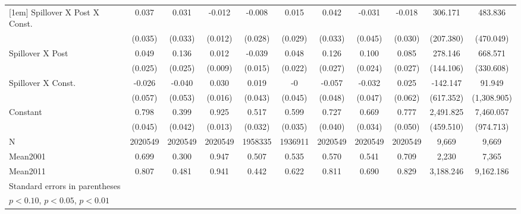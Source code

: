 {\begin{tabular}{l*{10}{c}}
[1em]
Spillover X Post X Const.&    0.037         &    0.031         &   -0.012         &   -0.008         &    0.015         &    0.042         &   -0.031         &   -0.018         &  306.171         &  483.836         \\
                &  (0.035)         &  (0.033)         &  (0.012)         &  (0.028)         &  (0.029)         &  (0.033)         &  (0.045)         &  (0.030)         &(207.380)         &(470.049)         \\
[1em]
Spillover X Post&    0.049\sym{*}  &    0.136\sym{***}&    0.012         &   -0.039\sym{**} &    0.048\sym{**} &    0.126\sym{***}&    0.100\sym{***}&    0.085\sym{***}&  278.146\sym{*}  &  668.571\sym{**} \\
                &  (0.025)         &  (0.025)         &  (0.009)         &  (0.015)         &  (0.022)         &  (0.027)         &  (0.024)         &  (0.027)         &(144.106)         &(330.608)         \\
[1em]
Spillover X Const.&   -0.026         &   -0.040         &    0.030\sym{*}  &    0.019         &   -0         &   -0.057         &   -0.032         &    0.025         & -142.147         &   91.949         \\
                &  (0.057)         &  (0.053)         &  (0.016)         &  (0.043)         &  (0.045)         &  (0.048)         &  (0.047)         &  (0.062)         &(617.352)         &(1,308.905)         \\
[1em]
Constant        &    0.798\sym{***}&    0.399\sym{***}&    0.925\sym{***}&    0.517\sym{***}&    0.599\sym{***}&    0.727\sym{***}&    0.669\sym{***}&    0.777\sym{***}&2,491.825\sym{***}&7,460.057\sym{***}\\
                &  (0.045)         &  (0.042)         &  (0.013)         &  (0.032)         &  (0.035)         &  (0.040)         &  (0.034)         &  (0.050)         &(459.510)         &(974.713)         \\
\hline
N               &2020549         &2020549         &2020549         &1958335         &1936911         &2020549         &2020549         &2020549         &9,669         &9,669         \\
Mean2001        &    0.699         &    0.300         &    0.947         &    0.507         &    0.535         &    0.570         &    0.541         &    0.709         &2,230         &7,365       \\
Mean2011        &    0.807         &    0.481         &    0.941         &    0.442         &    0.622         &    0.811         &    0.690         &    0.829         &3,188.246         &9,162.186         \\
\hline\hline
\multicolumn{11}{l}{\footnotesize Standard errors in parentheses}\\
\multicolumn{11}{l}{\footnotesize \sym{*} \(p<0.10\), \sym{**} \(p<0.05\), \sym{***} \(p<0.01\)}\\
\end{tabular}
}
